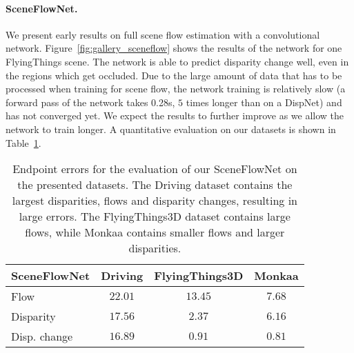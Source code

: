 \documentclass[10pt,twocolumn,letterpaper]{article}
\begin{document}
\paragraph{SceneFlowNet.}
We present early results on full scene flow estimation with a convolutional network.
Figure~\ref{fig:gallery_sceneflow} shows the results of the network for one FlyingThings scene. 
The network is able to predict disparity change  well, even in the regions which get occluded.
Due to the large amount of data that has to be processed when training for scene flow, the network training is relatively slow (a forward pass of the network takes 0.28s, $5$ times longer than on a DispNet) and has not converged yet. 
We expect the results to further improve as we allow the network to train longer.  
A quantitative evaluation on our datasets is shown in Table~\ref{table:sceneflownet_evaluation}. 

\begin{table}
  \begin{center}
    \begin{tabular}{|l||c|c|c|}
      \hline
      SceneFlowNet & Driving & FlyingThings3D & Monkaa \\
      \hline
      \hline
      Flow              & $22.01$  & $13.45$ & $7.68$ \\
      Disparity         & $17.56$  & $2.37$ & $6.16$ \\
      Disp. change  & $16.89$  & $0.91$ & $0.81$ \\
      \hline
      \end{tabular}
  \end{center}
  \caption{Endpoint errors for the evaluation of our SceneFlowNet on the presented datasets. 
  The Driving dataset contains the largest disparities, flows and disparity changes, resulting in large errors. 
  The FlyingThings3D dataset contains large flows, while Monkaa contains smaller flows and larger disparities.}
  \label{table:sceneflownet_evaluation}
\end{table}


\end{document}
